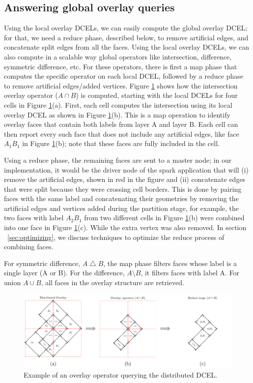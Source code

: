 \subsection{Answering global overlay queries} \label{sec:reduce}
Using the local overlay DCELs, we can easily compute the global overlay DCEL; for that, we need a reduce phase, described below, to remove artificial edges, and 
concatenate split edges from all the faces. Using the local overlay DCELs, we can also compute in a scalable way global operators like intersection, difference, 
symmetric difference, etc. For these operators, there is first a map phase that computes the specific operator on each local DCEL, followed by a reduce phase to 
remove artificial edges/added vertices.
Figure \ref{fig:overlay_operator} shows how the intersection overlay operator ($A \cap B$) is computed, starting with the local DCELs for four cells in Figure 
\ref{fig:overlay_operator}(a). First, each cell computes the intersection using its local overlay DCEL as shown in Figure \ref{fig:overlay_operator}(b). This is 
a map operation to identify overlay faces that contain both labels from layer A and layer B. Each cell can then report every such face that does not include any 
artificial edges, like face $A_1B_1$ in Figure \ref{fig:overlay_operator}(b); note that these faces are fully included in the cell. 

Using a reduce phase, the remaining faces are sent to a master node; in our implementation, it would be the driver node of the spark application that will (i) 
remove the artificial edges, shown in red in the figure and (ii) concatenate edges that were split because they were crossing cell borders. This is done by 
pairing faces with the same label and concatenating their geometries by removing the artificial edges and vertices added during the partition stage, for 
example, the two faces with label $A_2B_1$ from two different cells in Figure \ref{fig:overlay_operator}(b) were combined into one face in Figure 
\ref{fig:overlay_operator}(c). While the extra vertex was also removed. In section ~\ref{sec:optimizing}, we discuss techniques to optimize the reduce process 
of combining faces.

For symmetric difference, $A \bigtriangleup B$, the map phase filters faces whose label is a single layer (A or B). For the difference, $A \setminus B$, it 
filters faces with label A. For union $A \cup B$, all faces in the overlay structure are retrieved. 

\begin{figure}
    \centering
    \includegraphics[width=\linewidth]{chapterSDCEL/overlay_operator.pdf}    
    \caption{Example of an overlay operator querying the distributed DCEL.} \label{fig:overlay_operator}
\end{figure}

